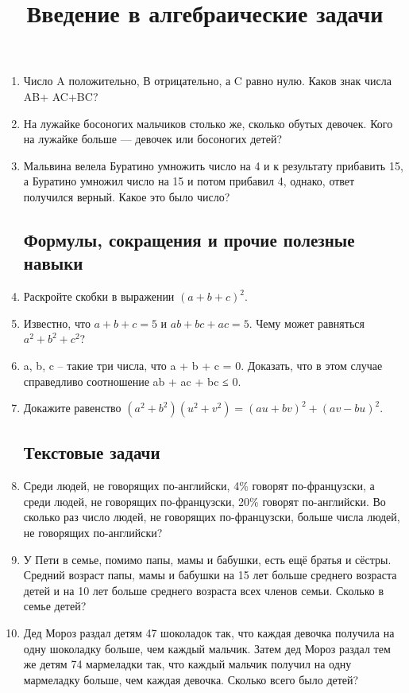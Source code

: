 \documentclass[a4paper,12pt]{article}
\title{Введение в алгебраические задачи}
\begin{document}
\maketitle
    \begin{enumerate}
    \subsection*{Околоалгебраические задачи}
    \item Число A положительно, В отрицательно, а C равно нулю. Каков знак числа AB+ AC+BC?
    \item На лужайке босоногих мальчиков столько же, сколько обутых девочек. Кого на лужайке больше — девочек или босоногих детей?
    \item Мальвина велела Буратино умножить число на 4 и к результату прибавить 15, а Буратино умножил число на 15 и потом прибавил 4, однако, ответ получился верный. Какое это было число?
    \subsection*{Формулы, сокращения и прочие полезные навыки}
    \item Раскройте скобки в выражении $(a+b+c)^2$.
    \item Известно, что  $a + b + c = 5$  и  $ab + bc + ac = 5$.  Чему может равняться  $a^2 + b^2 + c^2$?
    \item a, b, c – такие три числа, что  a + b + c = 0.  Доказать, что в этом случае справедливо соотношение  ab + ac + bc ≤ 0.
    \item Докажите равенство  $(a^2 + b^2)(u^2 + v^2) = (au + bv)^2 + (av - bu)^2$.
    \subsection*{Текстовые задачи}
    \item Среди людей, не говорящих по-английски, 4\%   говорят по-французски, а среди людей, не говорящих по-французски, 20\%   говорят по-английски. Во сколько раз число людей, не говорящих по-французски, больше числа людей, не говорящих по-английски?
    \item У Пети в семье, помимо папы, мамы и бабушки, есть ещё братья и сёстры. Средний возраст папы, мамы и бабушки на 15 лет больше среднего возраста детей и на 10 лет больше среднего возраста всех членов семьи. Сколько в семье детей?
    \item Дед Мороз раздал детям 47 шоколадок так, что каждая девочка получила на одну шоколадку больше, чем каждый мальчик. Затем дед Мороз раздал тем же детям 74 мармеладки так, что каждый мальчик получил на одну мармеладку больше, чем каждая девочка. Сколько всего было детей?
        
    \end{enumerate}
\end{document}
